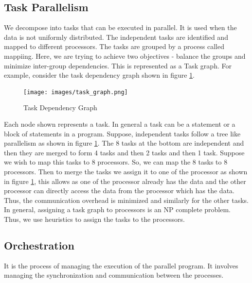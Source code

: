 \documentclass[12pt]{article}
\begin{document}
\subsection{Task Parallelism}
We decompose into tasks that can be executed in parallel. It is used when the data is not uniformly distributed.
The independent tasks are identified and mapped to different processors. The tasks are grouped by a process called mappiing. 
Here, we are trying to achieve two objectives - balance the groups and minimize inter-group dependencies.
This is represented as a Task graph. For example, consider the task dependency graph shown in figure 
\ref{fig:task_graph}.
\begin{figure}[H]
    \centering
    \texttt{[image: images/task\_graph.png]}
    \caption{Task Dependency Graph}
    \label{fig:task_graph}
\end{figure}
Each node shown represents a task. In general a task can be a statement or a block of statements in a program. 
Suppose, independent tasks follow a tree like parallelism as shown in figure \ref{fig:task_graph}.
The 8 tasks at the bottom are independent and then they are merged to form 4 tasks and then 2 tasks and then 1 task.
Suppose we wish to map this tasks to 8 processors. So, we can map the 8 tasks to 8 processors. Then to merge the tasks we assign it to one of the 
processor as shown in figure \ref{fig:task_graph}, this allows as one of the processor already has the data and the other processor 
can directly access the data from the processor which has the data. Thus, the communication overhead is minimized and similarly for the other tasks.
In general, assigning a task graph to processors is an NP complete problem. Thus, we use heuristics to assign the tasks to the processors.

\subsection{Orchestration}
It is the process of managing the execution of the parallel program. It involves managing the synchronization and communication between the processes.
\end{document}
